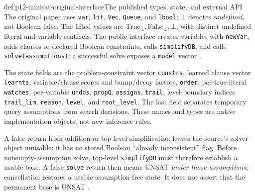 \begin{hbdefinition}{def:p12-minisat-original-interface}{The published types, state, and external API}
The original paper uses \texttt{var}, \texttt{lit}, \texttt{Vec},
\texttt{Queue}, and \texttt{lbool}; \(\bot\) denotes \emph{undefined},
not Boolean false.  The lifted values are
\(\mathrm{True}_{\bot},\mathrm{False}_{\bot},\bot\), with distinct
undefined literal and variable sentinels.  The public interface creates
variables with \texttt{newVar}, adds clauses or declared Boolean constraints,
calls \texttt{simplifyDB}, and calls \texttt{solve(assumptions)}; a successful
solve exposes a \texttt{model} vector
\cite[Secs.~2, 4.1; Figs.~1--3]{EenSorensson2003}.

The state fields are the problem-constraint vector \texttt{constrs}, learned
clause vector \texttt{learnts}, variable/clause scores and bump/decay factors,
\texttt{order}, per-true-literal \texttt{watches}, per-variable
\texttt{undos}, \texttt{propQ}, \texttt{assigns}, \texttt{trail}, level-boundary
indices \texttt{trail\_lim}, \texttt{reason}, \texttt{level}, and
\texttt{root\_level}.  The last field separates temporary query assumptions
from search decisions.  These names and types are native implementation
objects, not new inference rules.

A false return from addition or top-level simplification leaves the source's
solver object unusable: it has no stored Boolean ``already inconsistent''
flag.  Before nonempty-assumption solve, top-level \texttt{simplifyDB} must
therefore establish a usable base.  A false \texttt{solve} return then means
UNSAT \emph{under those assumptions}; cancellation restores a usable
assumption-free state.  It does not assert that the permanent base is UNSAT
\cite[Sec.~2, pp.~503--504; Fig.~8]{EenSorensson2003}.
\end{hbdefinition}

